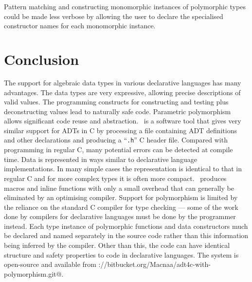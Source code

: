 Pattern matching and constructing monomorphic instances of polymorphic 
types could be made less verbose by allowing the user to declare the
specialised constructor names for each monomorphic instance.

\section{Conclusion}
\label{sec-conc}

The support for algebraic data types in various declarative languages has
many advantages.  The data types are very expressive, allowing precise
descriptions of valid values.  The programming constructs for constructing
and testing plus deconstructing values lead to naturally safe code.  Parametric
polymorphism allows significant code reuse and abstraction.  \Adtpp\ is
a software tool that gives very similar support for ADTs in C by
processing a file containing ADT definitions and other declarations and
producing a ``\texttt{.h}'' C header file.  Compared with programming in
regular C, many potential errors can be detected at compile time.  Data is
represented in ways similar to declarative language implementations.
In many simple cases the representation is identical to that in regular
C and for more complex types it is often more compact.  \Adtpp\ produces
macros and inline functions with only a small overhead that can generally
be eliminated by an optimising compiler.  Support for polymorphism is
limited by the reliance on the standard C compiler for type checking
--- some of the work done by compilers for declarative languages must
be done by the programmer instead.  Each type instance of polymorphic
functions and data constructors much be declared and named separately
in the source code rather than this information being inferred by the
compiler.  Other than this, the code can have identical structure and
safety properties to code in declarative languages.
The system is open-source and available from
\verb@https://bitbucket.org/Macnaa/adt4c-with-polymorphism.git@.
